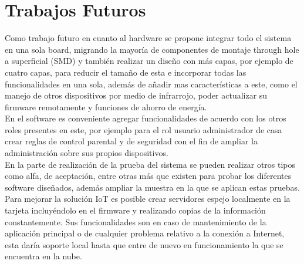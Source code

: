 \chapter{Trabajos Futuros}

Como trabajo futuro en cuanto al hardware se propone integrar todo el sistema en una sola board, migrando la mayoría de componentes de montaje through hole a superficial (SMD) y también realizar un diseño con más capas, por ejemplo de cuatro capas, para reducir el tamaño de esta e incorporar todas las funcionalidades en una sola, además de añadir mas características a este, como el manejo de otros dispositivos por medio de infrarrojo, poder actualizar su firmware remotamente y funciones de ahorro de energía.\\

En el software es conveniente agregar funcionalidades de acuerdo con los otros roles presentes en este, por ejemplo para el rol usuario administrador de casa crear reglas de control parental y de seguridad con el fin de ampliar la administración sobre sus propios dispositivos.\\

En la parte de realización de la prueba del sistema se pueden realizar otros tipos como alfa, de aceptación, entre otras más que existen para probar los diferentes software diseñados, además ampliar la muestra en la que se aplican estas pruebas.\\

Para mejorar la solución IoT es posible crear servidores espejo localmente en la tarjeta incluyéndolo en el firmware y realizando copias de la información constantemente. Sus funcionalidades son en caso de mantenimiento de la aplicación principal o de cualquier problema relativo a la conexión a Internet, esta daría soporte local hasta que entre de nuevo en funcionamiento la que se encuentra en la nube.\\
